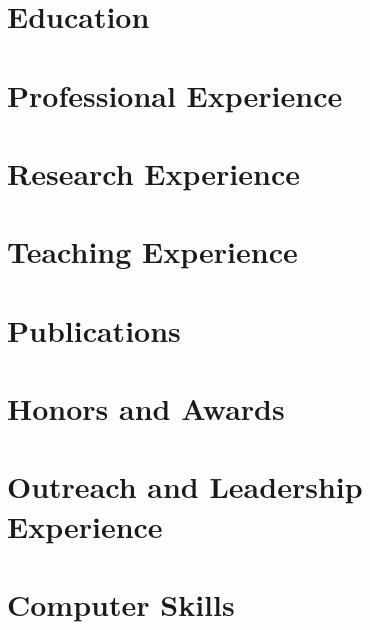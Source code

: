 \documentclass{resume}
\begin{document}
    

%     

\section{Education}
    

%     

\section{Professional Experience}
    
    
    

\section{Research Experience}
    
    

\section{Teaching Experience}
    
    
    
    

\section{Publications}
    

\section{Honors and Awards}
    

\section{Outreach and Leadership Experience}
    

\section{Computer Skills}
    
    
    
    
\end{document}
